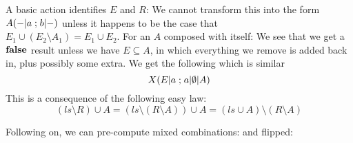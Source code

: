 A basic action identifies $E$ and $R$:
We cannot transform this into the form $A(-|a\mathrel{;} b|-)$
unless it happens to be the case that
\\$E_1 \cup (E_2\setminus A_1)= E_1 \cup E_2$.
For an $A$ composed with itself:
We see that we get a $\mathbf{false}$ result unless we have $E \subseteq A$,
in which everything we remove is added back in, plus possibly some extra.
We get the following which is similar
\[
  X(E|a\mathrel{;} a|\emptyset|A)
\]
This is a consequence of the following easy law:
\[
 (ls \setminus R) \cup A
 =
 (ls \setminus (R \setminus A)) \cup A
 =
 (ls \cup A) \setminus (R \setminus A)
\]

Following on, we can pre-compute mixed combinations:
and flipped:

